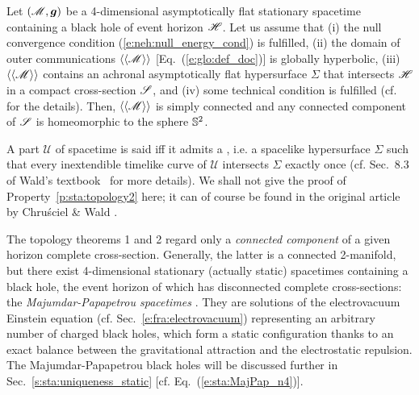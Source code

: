 \begin{prop}
\label{p:sta:topology2}
Let $(\mathscr{M}, \bm{g})$ be a 4-dimensional asymptotically flat stationary spacetime
containing a black hole of event horizon $\mathscr{H}$.
Let us assume that (i) the
null convergence condition  (\ref{e:neh:null_energy_cond}) is fulfilled,
(ii) the domain of outer communications $\langle\langle \mathscr{M}\rangle\rangle$
[Eq.~(\ref{e:glo:def_doc})]
is globally hyperbolic,
(iii) $\langle\langle \mathscr{M}\rangle\rangle$ contains an achronal asymptotically
flat hypersurface $\Sigma$ that intersects $\mathscr{H}$ in a compact cross-section $\mathscr{S}$,
and (iv) some technical condition is fulfilled (cf. \cite{ChrusW94b} for the details).
Then, $\langle\langle \mathscr{M}\rangle\rangle$ is simply connected and
any connected component of $\mathscr{S}$ is homeomorphic to the sphere $\mathbb{S}^2$.
\end{prop}
A part $\mathscr{U}$ of spacetime is said
\label{d:sta:glob_hyperbol}
iff it admits a \label{d:sta:Cauchy_surface}, i.e. a spacelike
hypersurface $\Sigma$ such that every inextendible timelike curve of $\mathscr{U}$
intersects $\Sigma$ exactly once (cf. Sec.~8.3 of Wald's textbook~\cite{Wald84} for more
details). We shall not give the proof of Property~\ref{p:sta:topology2} here; it can of course
be found in the original article by Chru\'sciel \& Wald \cite{ChrusW94b}.

\begin{remark}
\label{r:sta:Majumdar_Papapetrou}
The topology theorems 1 and 2 regard only
a \emph{connected component} of a given horizon complete cross-section.
Generally, the latter is a connected 2-manifold, but there exist
4-dimensional stationary (actually static) spacetimes containing a black hole,
the event horizon of which has
disconnected complete cross-sections: the
\emph{Majumdar-Papapetrou spacetimes}
\cite{Majum47,Papap47,HartlH72}. They are solutions of the
electrovacuum Einstein equation (cf. Sec.~\ref{e:fra:electrovacuum})
representing an arbitrary number of charged black holes,
which form a static configuration thanks to
an exact balance between the gravitational
attraction and the electrostatic repulsion. The Majumdar-Papapetrou black holes will be discussed
further in Sec.~\ref{s:sta:uniqueness_static} [cf. Eq.~(\ref{e:sta:MajPap_n4})].
\end{remark}

